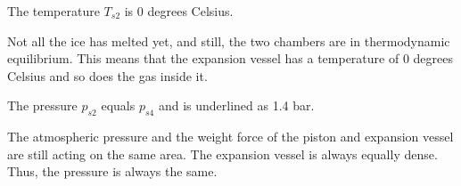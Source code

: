 The temperature \( T_{s2} \) is 0 degrees Celsius.

Not all the ice has melted yet, and still, the two chambers are in thermodynamic equilibrium. This means that the expansion vessel has a temperature of 0 degrees Celsius and so does the gas inside it.

The pressure \( p_{s2} \) equals \( p_{s4} \) and is underlined as 1.4 bar.

The atmospheric pressure and the weight force of the piston and expansion vessel are still acting on the same area. The expansion vessel is always equally dense. Thus, the pressure is always the same.
